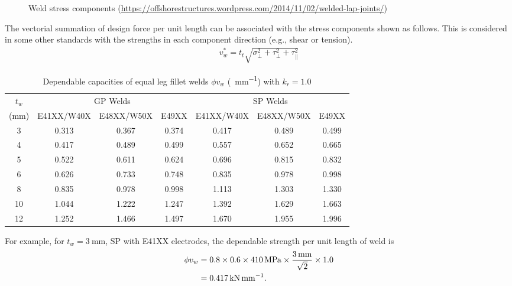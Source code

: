 \begin{figure}[H]
\centering

\caption{Weld stress components (\href{https://offshorestructures.wordpress.com/2014/11/02/welded-lap-joints/}{\url{https://offshorestructures.wordpress.com/2014/11/02/welded-lap-joints/}})}
\end{figure}
The vectorial summation of design force per unit length can be associated with the stress components shown as follows.
This is considered in some other standards with the strengths in each component direction (e.g., shear or tension).
\begin{gather}
v_w^*=t_t\sqrt{\sigma_\perp^2+\tau_\perp^2+\tau_\parallel^2}
\end{gather}
\begin{table}[H]
\centering\footnotesize
\caption{Dependable capacities of equal leg fillet welds $\phi{}v_w$ (\si{\kn\per\mm}) with $k_r=1.0$}\label{tab:phi_v_w}
\begin{tabular}{c|c|c|c|c|c|c}
    \toprule
      $t_w$    &  \multicolumn{3}{c|}{GP Welds}  &  \multicolumn{3}{c}{SP Welds}   \\
    (\si{\mm}) & E41XX/W40X & E48XX/W50X & E49XX & E41XX/W40X & E48XX/W50X & E49XX \\ \midrule
        3      &   0.313    &   0.367    & 0.374 &   0.417    &   0.489    & 0.499 \\
        4      &   0.417    &   0.489    & 0.499 &   0.557    &   0.652    & 0.665 \\
        5      &   0.522    &   0.611    & 0.624 &   0.696    &   0.815    & 0.832 \\
        6      &   0.626    &   0.733    & 0.748 &   0.835    &   0.978    & 0.998 \\
        8      &   0.835    &   0.978    & 0.998 &   1.113    &   1.303    & 1.330 \\
        10     &   1.044    &   1.222    & 1.247 &   1.392    &   1.629    & 1.663 \\
        12     &   1.252    &   1.466    & 1.497 &   1.670    &   1.955    & 1.996 \\ \bottomrule
\end{tabular}
\end{table}

For example, for $t_w=\SI{3}{\mm}$, SP with E41XX electrodes, the dependable strength per unit length of weld is
\begin{align*}
\phi{}v_w&=0.8\times0.6\times\SI{410}{\mega\pascal}\times\dfrac{\SI{3}{\milli\meter}}{\sqrt{2}}\times1.0\\
&=\SI{0.417}{\kilo\newton\per\milli\meter}.
\end{align*}

